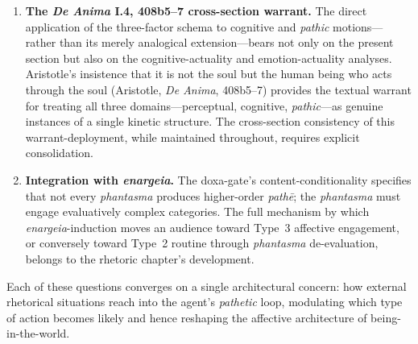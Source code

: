 \documentclass{article}
\begin{document}
\begin{enumerate}
situations that are ``threatening and promising with respect to our human being-in-the-world'' will anchor the analysis of \textit{Mitsein}-mediated persuasion. \item \textbf{The \textit{De Anima} I.4, 408b5--7 cross-section warrant.} The direct application of the three-factor schema to cognitive and \textit{pathic} motions---rather than its merely analogical extension---bears not only on the present section but also on the cognitive-actuality and emotion-actuality analyses. Aristotle's insistence that it is not the soul but the human being who acts through the soul (Aristotle, \textit{De Anima}, 408b5--7) provides the textual warrant for treating all three domains---perceptual, cognitive, \textit{pathic}---as genuine instances of a single kinetic structure. The cross-section consistency of this warrant-deployment, while maintained throughout, requires explicit consolidation. \item \textbf{Integration with \textit{enargeia}.} The doxa-gate's content-conditionality specifies that not every \textit{phantasma} produces higher-order \textit{pathē}; the \textit{phantasma} must engage evaluatively complex categories. The full mechanism by which \textit{enargeia}-induction moves an audience toward Type~3 affective engagement, or conversely toward Type~2 routine through \textit{phantasma} de-evaluation, belongs to the rhetoric chapter's development. \end{enumerate}

Each of these questions converges on a single architectural concern: how external rhetorical situations reach into the agent's \textit{pathetic} loop, modulating which type of action becomes likely and hence reshaping the affective architecture of being-in-the-world.

\end{document}
